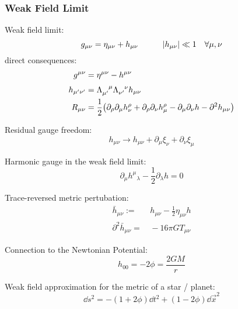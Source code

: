 		\subsubsection{Weak Field Limit}
			Weak field limit:
			\begin{equation}
				g_{\mu\nu} = \eta_{\mu\nu} + h_{\mu\nu} \hspace{30pt} \abs{h_{\mu\nu}} \ll 1 \quad \forall \mu,\nu
			\end{equation}
			direct consequences:
			\begin{equation}
				\begin{aligned}
					g^{\mu\nu} &= \eta^{\mu\nu} - h^{\mu\nu} \\
					h_{\mu'\nu'} &= \Lambda_{\mu'}^{\phantom{\mu'}\mu} \Lambda_{\nu'}^{\phantom{\nu'}\nu} h_{\mu\nu} \\
					R_{\mu\nu} &= \frac{1}{2}\qty(\partial_\rho \partial_\mu h_{\nu}^{\rho} + \partial_\rho \partial_\nu h_{\mu}^{\rho} - \partial_\mu \partial_\nu h - \partial^2 h_{\mu\nu}) \\
				\end{aligned}
			\end{equation}

			\noindent
			Residual gauge freedom:
			\begin{equation}
				h_{\mu\nu} \rightarrow h_{\mu\nu} + \partial_\mu \xi_\nu + \partial_\nu \xi_\mu
			\end{equation}

			\noindent
			Harmonic gauge in the weak field limit:
			\begin{equation}
				\partial_\mu h^\mu{}_\lambda - \frac{1}{2}\partial_\lambda h = 0
			\end{equation}

			\noindent
			Trace-reversed metric pertubation:
			\begin{equation}
				\begin{aligned}
					\bar{h}_{\mu\nu} :=&\, h_{\mu\nu} - \frac{1}{2} \eta_{\mu\nu} h \\
					\partial^2 \bar{h}_{\mu\nu} =&\, -16\pi G T_{\mu\nu}
				\end{aligned}
			\end{equation}

			\noindent
			Connection to the Newtonian Potential:
			\begin{equation}
				h_{00} = -2\phi = \frac{2GM}{r}
			\end{equation}

			\noindent
			Weak field approximation for the metric of a star / planet:
			\begin{equation}
				\dd{s}^2 = -(1+2\phi)\dd{t}^2 + (1-2\phi)\dd{\vec{x}}^2
			\end{equation}

